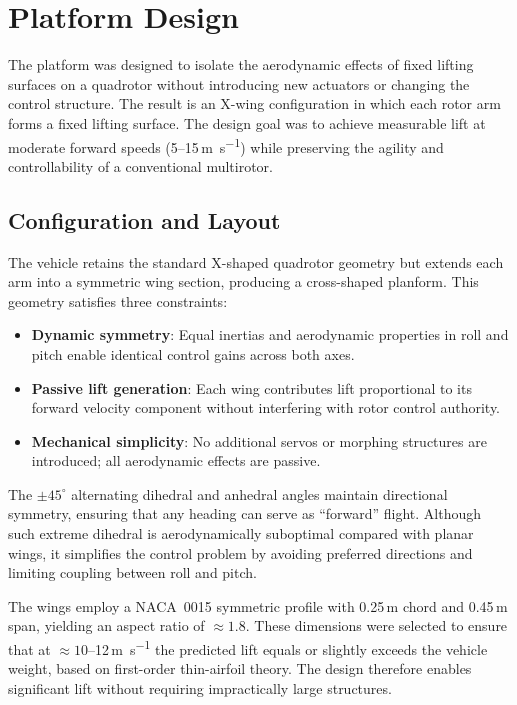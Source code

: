 
\chapter{Platform Design}\label{chapter:platform-design}

The platform was designed to isolate the aerodynamic effects of fixed lifting surfaces on a quadrotor without introducing new actuators or changing the control structure. The result is an X-wing configuration in which each rotor arm forms a fixed lifting surface. The design goal was to achieve measurable lift at moderate forward speeds (5--15\,\si{\meter\per\second}) while preserving the agility and controllability of a conventional multirotor.

\section{Configuration and Layout}

The vehicle retains the standard X-shaped quadrotor geometry but extends each arm into a symmetric wing section, producing a cross-shaped planform. This geometry satisfies three constraints:

\begin{itemize}
  \item \textbf{Dynamic symmetry}: Equal inertias and aerodynamic properties in roll and pitch enable identical control gains across both axes.
  
  \item \textbf{Passive lift generation}: Each wing contributes lift proportional to its forward velocity component without interfering with rotor control authority.
  
  \item \textbf{Mechanical simplicity}: No additional servos or morphing structures are introduced; all aerodynamic effects are passive.
\end{itemize}

The $\pm 45^{\circ}$ alternating dihedral and anhedral angles maintain directional symmetry, ensuring that any heading can serve as ``forward'' flight. Although such extreme dihedral is aerodynamically suboptimal compared with planar wings, it simplifies the control problem by avoiding preferred directions and limiting coupling between roll and pitch.

The wings employ a NACA~0015 symmetric profile with 0.25\,m chord and 0.45\,m span, yielding an aspect ratio of $\approx 1.8$. These dimensions were selected to ensure that at $\approx 10$--12\,\si{\meter\per\second} the predicted lift equals or slightly exceeds the vehicle weight, based on first-order thin-airfoil theory. The design therefore enables significant lift without requiring impractically large structures.

